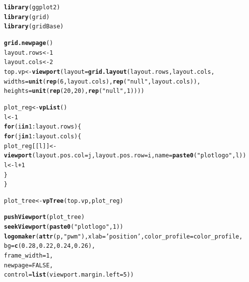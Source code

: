 \documentclass[12pt]{article}\usepackage[]{graphicx}\usepackage[usenames,dvipsnames]{color}
\makeatletter
\newcommand{\hlnum}[1]{\textcolor[rgb]{0.686,0.059,0.569}{#1}}%
\newcommand{\hlstr}[1]{\textcolor[rgb]{0.192,0.494,0.8}{#1}}%
\newcommand{\hlopt}[1]{\textcolor[rgb]{0,0,0}{#1}}%
\newcommand{\hlstd}[1]{\textcolor[rgb]{0.345,0.345,0.345}{#1}}%
\newcommand{\hlkwa}[1]{\textcolor[rgb]{0.161,0.373,0.58}{\textbf{#1}}}%
\newcommand{\hlkwb}[1]{\textcolor[rgb]{0.69,0.353,0.396}{#1}}%
\newcommand{\hlkwc}[1]{\textcolor[rgb]{0.333,0.667,0.333}{#1}}%
\newcommand{\hlkwd}[1]{\textcolor[rgb]{0.737,0.353,0.396}{\textbf{#1}}}%
\newenvironment{kframe}{%
 \def\at@end@of@kframe{}%
 \ifinner\ifhmode%
  \def\at@end@of@kframe{\end{minipage}}%
  \begin{minipage}{\columnwidth}%
 \fi\fi%
 \def\FrameCommand##1{\hskip\@totalleftmargin \hskip-\fboxsep
 \colorbox{shadecolor}{##1}\hskip-\fboxsep
     \hskip-\linewidth \hskip-\@totalleftmargin \hskip\columnwidth}%
 \MakeFramed {\advance\hsize-\width
   \@totalleftmargin\z@ \linewidth\hsize
   \@setminipage}}%
 {\par\unskip\endMakeFramed%
 \at@end@of@kframe}
\newenvironment{knitrout}{}{} %
\makeatother
\begin{document}
\begin{knitrout}
\color{fgcolor}\begin{kframe}
\begin{alltt}
\hlkwd{library}\hlstd{(ggplot2)}
\hlkwd{library}\hlstd{(grid)}
\hlkwd{library}\hlstd{(gridBase)}


\hlkwd{grid.newpage}\hlstd{()}
\hlstd{layout.rows} \hlkwb{<-} \hlnum{1}
\hlstd{layout.cols} \hlkwb{<-} \hlnum{2}
\hlstd{top.vp} \hlkwb{<-} \hlkwd{viewport}\hlstd{(}\hlkwc{layout}\hlstd{=}\hlkwd{grid.layout}\hlstd{(layout.rows, layout.cols,}
                                      \hlkwc{widths}\hlstd{=}\hlkwd{unit}\hlstd{(}\hlkwd{rep}\hlstd{(}\hlnum{6}\hlstd{,layout.cols),} \hlkwd{rep}\hlstd{(}\hlstr{"null"}\hlstd{, layout.cols)),}
                                      \hlkwc{heights}\hlstd{=}\hlkwd{unit}\hlstd{(}\hlkwd{rep}\hlstd{(}\hlnum{20}\hlstd{,}\hlnum{20}\hlstd{),} \hlkwd{rep}\hlstd{(}\hlstr{"null"}\hlstd{,}\hlnum{1}\hlstd{))))}

\hlstd{plot_reg} \hlkwb{<-} \hlkwd{vpList}\hlstd{()}
\hlstd{l} \hlkwb{<-} \hlnum{1}
\hlkwa{for}\hlstd{(i} \hlkwa{in} \hlnum{1}\hlopt{:}\hlstd{layout.rows)\{}
  \hlkwa{for}\hlstd{(j} \hlkwa{in} \hlnum{1}\hlopt{:}\hlstd{layout.cols)\{}
    \hlstd{plot_reg[[l]]} \hlkwb{<-} \hlkwd{viewport}\hlstd{(}\hlkwc{layout.pos.col} \hlstd{= j,} \hlkwc{layout.pos.row} \hlstd{= i,} \hlkwc{name} \hlstd{=} \hlkwd{paste0}\hlstd{(}\hlstr{"plotlogo"}\hlstd{, l))}
    \hlstd{l} \hlkwb{<-} \hlstd{l}\hlopt{+}\hlnum{1}
  \hlstd{\}}
\hlstd{\}}


\hlstd{plot_tree} \hlkwb{<-} \hlkwd{vpTree}\hlstd{(top.vp, plot_reg)}

\hlkwd{pushViewport}\hlstd{(plot_tree)}
\hlkwd{seekViewport}\hlstd{(}\hlkwd{paste0}\hlstd{(}\hlstr{"plotlogo"}\hlstd{,} \hlnum{1}\hlstd{))}
\hlkwd{logomaker}\hlstd{(}\hlkwd{attr}\hlstd{(p,} \hlstr{"pwm"}\hlstd{),}\hlkwc{xlab} \hlstd{=} \hlstr{'position'}\hlstd{,}\hlkwc{color_profile} \hlstd{= color_profile,}
          \hlkwc{bg} \hlstd{=} \hlkwd{c}\hlstd{(}\hlnum{0.28}\hlstd{,} \hlnum{0.22}\hlstd{,} \hlnum{0.24}\hlstd{,} \hlnum{0.26}\hlstd{),}
          \hlkwc{frame_width} \hlstd{=} \hlnum{1}\hlstd{,}
          \hlkwc{newpage} \hlstd{=} \hlnum{FALSE}\hlstd{,}
          \hlkwc{control} \hlstd{=} \hlkwd{list}\hlstd{(}\hlkwc{viewport.margin.left} \hlstd{=} \hlnum{5}\hlstd{))}



\end{alltt}
\end{kframe}
\end{knitrout}
\end{document}
